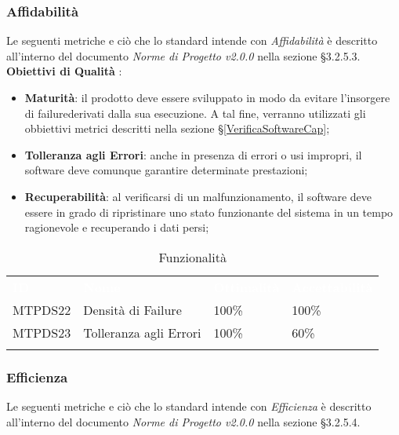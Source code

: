 \subsubsection{Affidabilità}

Le seguenti metriche e ciò che lo standard intende con \textit{Affidabilità} è descritto all'interno del documento \textit{Norme di Progetto v2.0.0} nella sezione §3.2.5.3. \\
\textbf{Obiettivi di Qualità} :

\begin{itemize}
	\item \textbf{Maturità}: il prodotto deve essere sviluppato in modo da evitare l'insorgere di failure\glossario derivati dalla sua esecuzione. A tal fine, verranno utilizzati gli obbiettivi metrici descritti nella sezione §\ref{VerificaSoftwareCap};
	\item \textbf{Tolleranza agli Errori}: anche in presenza di errori o usi impropri, il software deve comunque garantire determinate prestazioni;
	\item \textbf{Recuperabilità}: al verificarsi di un malfunzionamento, il software deve essere in grado di ripristinare uno stato funzionante del sistema in un tempo ragionevole e recuperando i dati persi;
\end{itemize}

\begin{longtable}{|C{.15\textwidth}|C{.24\textwidth}|C{.24\textwidth}|C{.24\textwidth}|}
\hline
{}\textbf{\textcolor{white}{ID}} & \textbf{\textcolor{white}{Nome}} & \textbf{\textcolor{white}{Ottimalità}} & \textbf{\textcolor{white}{Accettabilità}}\\
MTPDS22 & Densità di Failure & 100\% & 100\%\\
\hline
{}MTPDS23 & Tolleranza agli Errori & 100\% & 60\% \\ 
\hline
\caption{Funzionalità}
\label{Funzionalità}
\end{longtable}



\subsubsection{Efficienza}

Le seguenti metriche e ciò che lo standard intende con \textit{Efficienza} è descritto all'interno del documento \textit{Norme di Progetto v2.0.0} nella sezione §3.2.5.4. \\

